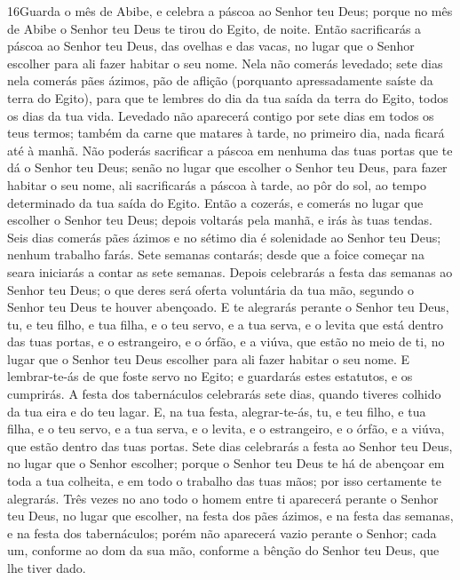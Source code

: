 \lettrine{16} Guarda o mês de Abibe, e celebra a páscoa ao
Senhor teu Deus; porque no mês de Abibe o Senhor teu Deus te tirou
do Egito, de noite. Então sacrificarás a páscoa ao Senhor teu
Deus, das ovelhas e das vacas, no lugar que o Senhor escolher para
ali fazer habitar o seu nome. Nela não comerás levedado; sete
dias nela comerás pães ázimos, pão de aflição (porquanto
apressadamente saíste da terra do Egito), para que te lembres do dia
da tua saída da terra do Egito, todos os dias da tua vida.
Levedado não aparecerá contigo por sete dias em todos os teus
termos; também da carne que matares à tarde, no primeiro dia, nada
ficará até à manhã. Não poderás sacrificar a páscoa em nenhuma
das tuas portas que te dá o Senhor teu Deus; senão no lugar que
escolher o Senhor teu Deus, para fazer habitar o seu nome, ali
sacrificarás a páscoa à tarde, ao pôr do sol, ao tempo determinado
da tua saída do Egito. Então a cozerás, e comerás no lugar que
escolher o Senhor teu Deus; depois voltarás pela manhã, e irás às
tuas tendas. Seis dias comerás pães ázimos e no sétimo dia é
solenidade ao Senhor teu Deus; nenhum trabalho farás. Sete
semanas contarás; desde que a foice começar na seara iniciarás a
contar as sete semanas. Depois celebrarás a festa das semanas
ao Senhor teu Deus; o que deres será oferta voluntária da tua mão,
segundo o Senhor teu Deus te houver abençoado. E te alegrarás
perante o Senhor teu Deus, tu, e teu filho, e tua filha, e o teu
servo, e a tua serva, e o levita que está dentro das tuas portas, e
o estrangeiro, e o órfão, e a viúva, que estão no meio de ti, no
lugar que o Senhor teu Deus escolher para ali fazer habitar o seu
nome. E lembrar-te-ás de que foste servo no Egito; e
guardarás estes estatutos, e os cumprirás. A festa dos
tabernáculos celebrarás sete dias, quando tiveres colhido da tua
eira e do teu lagar. E, na tua festa, alegrar-te-ás, tu, e
teu filho, e tua filha, e o teu servo, e a tua serva, e o levita, e
o estrangeiro, e o órfão, e a viúva, que estão dentro das tuas
portas. Sete dias celebrarás a festa ao Senhor teu Deus, no
lugar que o Senhor escolher; porque o Senhor teu Deus te há de
abençoar em toda a tua colheita, e em todo o trabalho das tuas mãos;
por isso certamente te alegrarás. Três vezes no ano todo o
homem entre ti aparecerá perante o Senhor teu Deus, no lugar que
escolher, na festa dos pães ázimos, e na festa das semanas, e na
festa dos tabernáculos; porém não aparecerá vazio perante o Senhor;
cada um, conforme ao dom da sua mão, conforme a bênção do
Senhor teu Deus, que lhe tiver dado.

